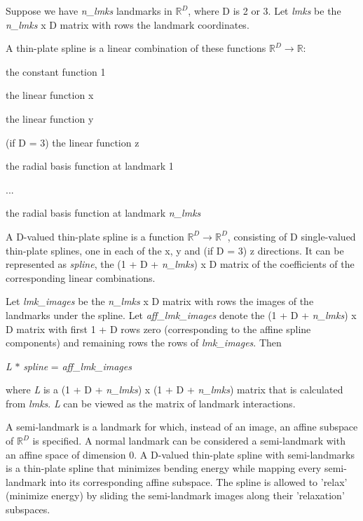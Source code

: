 Suppose we have {\itshape n\_\-lmks\/} landmarks in $\mathbb{R}^D$, where D is 2 or 3. Let {\itshape lmks\/} be the {\itshape n\_\-lmks\/} x D matrix with rows the landmark coordinates.

A thin-\/plate spline is a linear combination of these functions $\mathbb{R}^D\to\mathbb{R}$:
\begin{DoxyItemize}
\item the constant function 1
\item the linear function x
\item the linear function y
\item (if D = 3) the linear function z
\item the radial basis function at landmark 1
\item ...
\item the radial basis function at landmark {\itshape n\_\-lmks\/} 
\end{DoxyItemize}

A D-\/valued thin-\/plate spline is a function $\mathbb{R}^D\to\mathbb{R}^D$, consisting of D single-\/valued thin-\/plate splines, one in each of the x, y and (if D = 3) z directions. It can be represented as {\itshape spline\/}, the (1 + D + {\itshape n\_\-lmks\/}) x D matrix of the coefficients of the corresponding linear combinations.

Let {\itshape lmk\_\-images\/} be the {\itshape n\_\-lmks\/} x D matrix with rows the images of the landmarks under the spline. Let {\itshape aff\_\-lmk\_\-images\/} denote the (1 + D + {\itshape n\_\-lmks\/}) x D matrix with first 1 + D rows zero (corresponding to the affine spline components) and remaining rows the rows of {\itshape lmk\_\-images\/}. Then \begin{center} {\itshape L\/} $\ast$ {\itshape spline\/} = {\itshape aff\_\-lmk\_\-images\/} \end{center}  where {\itshape L\/} is a (1 + D + {\itshape n\_\-lmks\/}) x (1 + D + {\itshape n\_\-lmks\/}) matrix that is calculated from {\itshape lmks\/}. {\itshape L\/} can be viewed as the matrix of landmark interactions.

A semi-\/landmark is a landmark for which, instead of an image, an affine subspace of $\mathbb{R}^D$ is specified. A normal landmark can be considered a semi-\/landmark with an affine space of dimension 0. A D-\/valued thin-\/plate spline with semi-\/landmarks is a thin-\/plate spline that minimizes bending energy while mapping every semi-\/landmark into its corresponding affine subspace. The spline is allowed to 'relax' (minimize energy) by sliding the semi-\/landmark images along their 'relaxation' subspaces.

